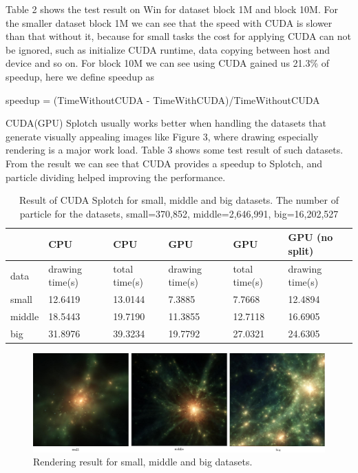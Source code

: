 Table 2 shows the test result on Win for dataset block 1M and block 10M. For the
smaller dataset block 1M we can see that the speed with CUDA is slower than that without
it, because for small tasks the cost for applying CUDA can not be ignored, 
such as initialize CUDA runtime, data copying between host and device and so on. For block
10M we can see using CUDA gained us 21.3\% of speedup, here we define speedup as

speedup = (TimeWithoutCUDA - TimeWithCUDA)/TimeWithoutCUDA

CUDA(GPU) Splotch usually works better when handling the datasets
that generate visually appealing images like Figure 3, where drawing especially rendering
is a major work load. Table 3 shows some test result of such datasets. 
From the result we can see that CUDA provides a speedup to Splotch, and 
particle dividing helped improving the performance.


\begin{table}
\caption{Result of CUDA Splotch for small, middle and big datasets. The number of particle for the 
datasets, small=370,852, middle=2,646,991, big=16,202,527}
\begin{center}
\begin{tabular}{ | l || l | l || l | l | p{2cm} |}
\hline  
   &	CPU	& CPU	& GPU	& GPU	& GPU (no split)\\
\hline
  data & drawing time(s) & total time(s) & drawing time(s) & total time(s) & drawing time(s) \\
\hline  
  small &	12.6419	& 13.0144	& 7.3885	& 7.7668	& 12.4894 \\
\hline
  middle &	18.5443 &	19.7190 &	11.3855 &	12.7118 &	16.6905 \\
\hline
  big	& 31.8976 &	39.3234 &	19.7792 &	27.0321	& 24.6305\\
\hline
\end{tabular}
\end{center}
\end{table}

\begin{figure}
\begin{center}
\includegraphics[width=1.0\textwidth]{cu_images.png}
\end{center}
\caption{Rendering result for small, middle and big datasets.}
\end{figure}


